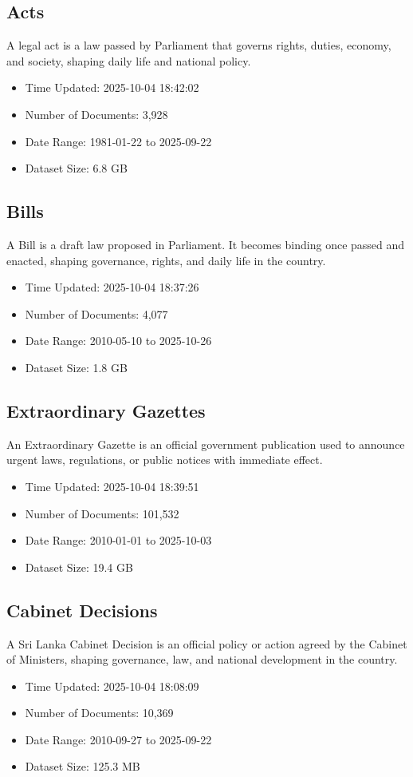 \documentclass[11pt,a4paper,twocolumn]{article}%
\begin{document}
%
\subsection{Acts}%
\label{subsec:Acts}%
A legal act is a law passed by Parliament that governs rights, duties, economy, and society, shaping daily life and national policy.%
\begin{itemize}%
\item%
Time Updated: 2025{-}10{-}04 18:42:02%
\item%
Number of Documents: 3,928%
\item%
Date Range: 1981{-}01{-}22 to 2025{-}09{-}22%
\item%
Dataset Size: 6.8 GB%
\end{itemize}

%
\subsection{Bills}%
\label{subsec:Bills}%
A Bill is a draft law proposed in Parliament. It becomes binding once passed and enacted, shaping governance, rights, and daily life in the country.%
\begin{itemize}%
\item%
Time Updated: 2025{-}10{-}04 18:37:26%
\item%
Number of Documents: 4,077%
\item%
Date Range: 2010{-}05{-}10 to 2025{-}10{-}26%
\item%
Dataset Size: 1.8 GB%
\end{itemize}

%
\subsection{Extraordinary Gazettes}%
\label{subsec:ExtraordinaryGazettes}%
An Extraordinary Gazette is an official government publication used to announce urgent laws, regulations, or public notices with immediate effect.%
\begin{itemize}%
\item%
Time Updated: 2025{-}10{-}04 18:39:51%
\item%
Number of Documents: 101,532%
\item%
Date Range: 2010{-}01{-}01 to 2025{-}10{-}03%
\item%
Dataset Size: 19.4 GB%
\end{itemize}

%
\subsection{Cabinet Decisions}%
\label{subsec:CabinetDecisions}%
A Sri Lanka Cabinet Decision is an official policy or action agreed by the Cabinet of Ministers, shaping governance, law, and national development in the country.%
\begin{itemize}%
\item%
Time Updated: 2025{-}10{-}04 18:08:09%
\item%
Number of Documents: 10,369%
\item%
Date Range: 2010{-}09{-}27 to 2025{-}09{-}22%
\item%
Dataset Size: 125.3 MB%
\end{itemize}
\end{document}
